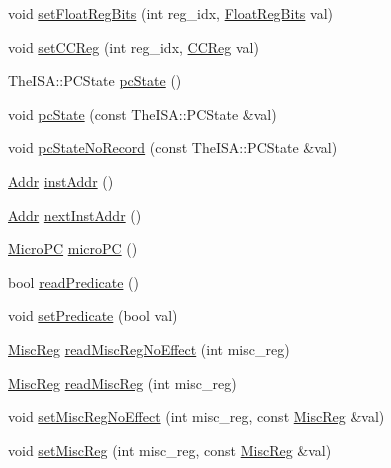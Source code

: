 \begin{DoxyCompactItemize}
\item 
void \hyperlink{classProxyThreadContext_a618651078f08ecd328dfe3312f0f2ea7}{setFloatRegBits} (int reg\_\-idx, \hyperlink{classThreadContext_aab5eeae86499f9bfe15ef79360eccc64}{FloatRegBits} val)
\item 
void \hyperlink{classProxyThreadContext_afd6c42b1888ad21a4382078ca7a86d09}{setCCReg} (int reg\_\-idx, \hyperlink{classThreadContext_a0c9de550a32808e6a25b54b6c791d5ab}{CCReg} val)
\item 
TheISA::PCState \hyperlink{classProxyThreadContext_a827fb3454585cf4c620f4fd341966317}{pcState} ()
\item 
void \hyperlink{classProxyThreadContext_a5e9cfc754c9ef9b7db875ce89871944e}{pcState} (const TheISA::PCState \&val)
\item 
void \hyperlink{classProxyThreadContext_a6005386aeeaecb35499c3199fb47ba2f}{pcStateNoRecord} (const TheISA::PCState \&val)
\item 
\hyperlink{base_2types_8hh_af1bb03d6a4ee096394a6749f0a169232}{Addr} \hyperlink{classProxyThreadContext_a53c92716db281ae16ffb693c6d7803c7}{instAddr} ()
\item 
\hyperlink{base_2types_8hh_af1bb03d6a4ee096394a6749f0a169232}{Addr} \hyperlink{classProxyThreadContext_aceec6e28772f91b3cc921c0e3927b0c2}{nextInstAddr} ()
\item 
\hyperlink{base_2types_8hh_adfb4d8b20c5abc8be73dd367b16f2d57}{MicroPC} \hyperlink{classProxyThreadContext_a1a21696f33a7d38f251687ae0b5e9718}{microPC} ()
\item 
bool \hyperlink{classProxyThreadContext_a254cecc48d457ea298b08a8bb009f9cf}{readPredicate} ()
\item 
void \hyperlink{classProxyThreadContext_a137a8c6cced89c2ff8387900439436b4}{setPredicate} (bool val)
\item 
\hyperlink{classThreadContext_aaf5f073a387db0556d1db4bcc45428bc}{MiscReg} \hyperlink{classProxyThreadContext_a7b5ac6af9c2c19d7c1b442b8a3aebbc6}{readMiscRegNoEffect} (int misc\_\-reg)
\item 
\hyperlink{classThreadContext_aaf5f073a387db0556d1db4bcc45428bc}{MiscReg} \hyperlink{classProxyThreadContext_a5a8c6c487e8da143d26188258b04f1cc}{readMiscReg} (int misc\_\-reg)
\item 
void \hyperlink{classProxyThreadContext_a763517aaea2f3decbc1ef9d064216b6f}{setMiscRegNoEffect} (int misc\_\-reg, const \hyperlink{classThreadContext_aaf5f073a387db0556d1db4bcc45428bc}{MiscReg} \&val)
\item 
void \hyperlink{classProxyThreadContext_a1877dde4f3eb17a8b7d33ea40176c148}{setMiscReg} (int misc\_\-reg, const \hyperlink{classThreadContext_aaf5f073a387db0556d1db4bcc45428bc}{MiscReg} \&val)

\end{DoxyCompactItemize}

